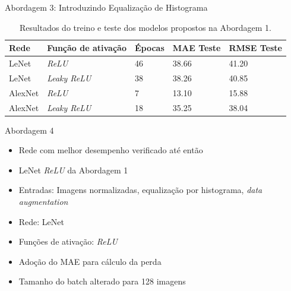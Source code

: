 \begin{frame}{Abordagem 3: Introduzindo Equalização de Histograma}
  \begin{table}[!ht]
		\caption{Resultados do treino e teste dos modelos propostos na Abordagem 1.}
		\label{tab:results-1}
		\begin{center}
			\begin{tabular}{l l l l l}
				\toprule
				Rede & Função de ativação & Épocas & MAE Teste & RMSE Teste \\
				\midrule
        LeNet & \emph{ReLU} & 46 &  38.66 & 41.20 \\
				LeNet & \emph{Leaky ReLU} &  38 & 38.26 & 40.85 \\
				AlexNet & \emph{ReLU} & 7 & 13.10 & 15.88 \\
				AlexNet & \emph{Leaky ReLU} & 18 & 35.25 & 38.04 \\
				\bottomrule
			\end{tabular}
		\end{center}
	\end{table}
\end{frame}



\begin{frame}{Abordagem 4}
 \begin{itemize}
   \item Rede com melhor desempenho verificado até então
   \item  \alert{LeNet \emph{ReLU} da Abordagem 1}
   \ \ \newline
   \item Entradas: Imagens normalizadas, equalização por histograma, \emph{data augmentation}
   \item Rede: LeNet
   \item Funções de ativação: \emph{ReLU}
   \ \ \newline
   \item Adoção do MAE para cálculo da perda
   \item Tamanho do batch alterado para 128 imagens
   \end{itemize}
\end{frame}

